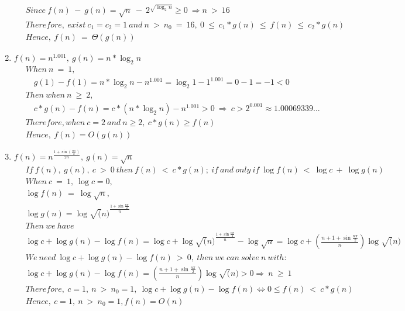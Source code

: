 \documentclass[a4paper]{scrartcl}
\begin{document}
\begin{enumerate}[label=(\alph*)]
  \begin{align*}
  &\ Since\ f(n)\ -\ g(n)=\sqrt{n}\ -\ 2^{\sqrt{\log_2 n}} \geq 0\ \Rightarrow n\ >\ 16\\ &\
  Therefore,\ exist\ c_1=c_2=1\ and\ n\ >\ n_0\ =\ 16,\ 0\ \leq\ c_1*g(n)\ \leq\ f(n)\ \leq\ c_2*g(n)\\ &\
  Hence,\ f(n)\ =\ \Theta(g(n))
  \end{align*}
  \item $f(n)=n^{1.001},\ g(n)=n*\log_2{n}$
  \begin{align*}
  &\ When\ n\ =\ 1,\\ &\ \quad g(1)-f(1)=n*\log_2{n}-n^{1.001}=\log_2{1}-1^{1.001}=0-1=-1<0 \\&\
  Then\ when\ n\ \geq\ 2, \\ &\ \quad
  c*g(n)-f(n)= c*(n*\log_2{n})-n^{1.001}>0\ \Rightarrow\ c > 2^{0.001} \approx 1.00069339...\\&\
  Therefore, when\ c=2\ and\ n \geq 2,\ c*g(n) \geq f(n)\\&\
  Hence,\ f(n) = O(g(n))
  \end{align*}
  \item $f(n)=n^{\frac{1+\sin(\frac{\pi n}{2})}{2n}},\ g(n)=\sqrt{n}$
  \begin{align*}
  &\ If\ f(n),\ g(n),\ c\ >\ 0\ then\ f(n)\ <\ c*g(n);\ if\ and\ only\ if\ \log{f(n)}\ <\ \log{c}\ +\ \log{g(n)}\\&\
  When\ c\ =\ 1,\ \log{c} = 0,\\&\
  \log{f(n)}\ =\ \log{\sqrt{n}},\\&\ \log{g(n)}=\log{\sqrt(n)}^{\frac{1+\sin{\frac{n\pi}{2}}}{n}}\\&\
  Then\ we\ have\\&\
  \log{c}+\log{g(n)}-\log{f(n)}=\log{c}+\log{\sqrt(n)}^{\frac{1+\sin{\frac{n\pi}{2}}}{n}}-\log{\sqrt{n}}=\log{c}+(\frac{n+1+\sin{\frac{n\pi}{2}}}{n})\log{\sqrt(n)}\\&\
  We\ need\ \log{c}+\log{g(n)}-\log{f(n)}\ >\ 0,\ then\ we\ can\ solve\ n\ with:\\ &\
  \log{c}+\log{g(n)}-\log{f(n)}=(\frac{n+1+\sin{\frac{n\pi}{2}}}{n})\log{\sqrt(n)}>0\Rightarrow\ n\ \geq\ 1 \\&\
  Therefore,\ c=1,\ n\ >\ n_0=1,\ \log{c}+\log{g(n)}-\log{f(n)} \iff 0 \leq f(n)\ <\ c*g(n)\\&\
  Hence, \ c=1,\ n\ >\ n_0=1, f(n)=O(n)
  \end{align*}
\end{enumerate}
\end{document}
